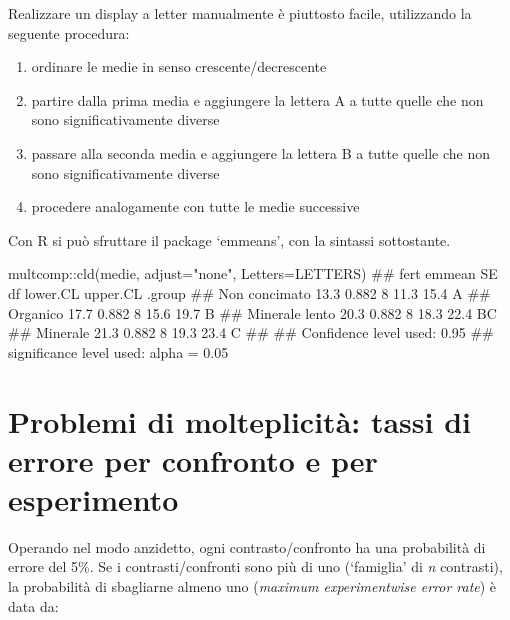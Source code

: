 \documentclass[a4paper,12pt,oneside]{book}
\providecommand{\tightlist}{%
  \setlength{\itemsep}{0pt}\setlength{\parskip}{0pt}}
\newenvironment{Shaded}{}{}
\newcommand{\KeywordTok}[1]{#1}
\newcommand{\DataTypeTok}[1]{#1}
\newcommand{\StringTok}[1]{#1}
\newcommand{\CommentTok}[1]{#1}
\newcommand{\OperatorTok}[1]{#1}
\newcommand{\NormalTok}[1]{#1}
\begin{document}
Realizzare un display a letter manualmente è piuttosto facile, utilizzando la seguente procedura:

\begin{enumerate}
\def\labelenumi{\arabic{enumi}.}
\tightlist
\item
  ordinare le medie in senso crescente/decrescente
\item
  partire dalla prima media e aggiungere la lettera A a tutte quelle che non sono significativamente diverse
\item
  passare alla seconda media e aggiungere la lettera B a tutte quelle che non sono significativamente diverse
\item
  procedere analogamente con tutte le medie successive
\end{enumerate}

Con R si può sfruttare il package `emmeans', con la sintassi sottostante.

\begin{Shaded}
\begin{Highlighting}[]
\NormalTok{multcomp}\OperatorTok{::}\KeywordTok{cld}\NormalTok{(medie, }\DataTypeTok{adjust=}\StringTok{"none"}\NormalTok{, }\DataTypeTok{Letters=}\NormalTok{LETTERS)}
\CommentTok{##  fert           emmean    SE df lower.CL upper.CL .group}
\CommentTok{##  Non concimato    13.3 0.882  8     11.3     15.4  A    }
\CommentTok{##  Organico         17.7 0.882  8     15.6     19.7   B   }
\CommentTok{##  Minerale lento   20.3 0.882  8     18.3     22.4   BC  }
\CommentTok{##  Minerale         21.3 0.882  8     19.3     23.4    C  }
\CommentTok{## }
\CommentTok{## Confidence level used: 0.95 }
\CommentTok{## significance level used: alpha = 0.05}
\end{Highlighting}
\end{Shaded}

\hypertarget{problemi-di-molteplicita-tassi-di-errore-per-confronto-e-per-esperimento}{%
\section{Problemi di molteplicità: tassi di errore per confronto e per esperimento}\label{problemi-di-molteplicita-tassi-di-errore-per-confronto-e-per-esperimento}}

Operando nel modo anzidetto, ogni contrasto/confronto ha una probabilità di errore del 5\%. Se i contrasti/confronti sono più di uno (`famiglia' di \emph{n} contrasti), la probabilità di sbagliarne almeno uno (\emph{maximum experimentwise error rate}) è data da:
\end{document}
